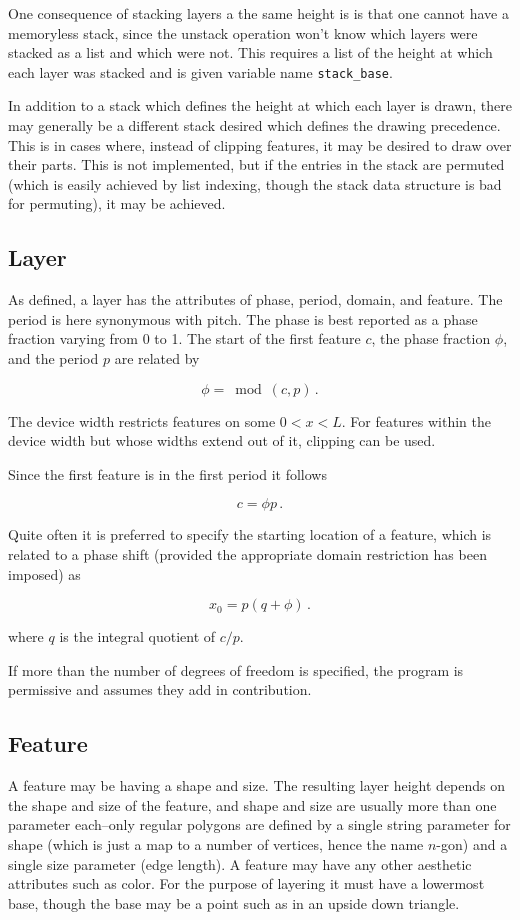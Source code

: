 \documentclass{article}
\begin{document}
One consequence of stacking layers a the same height is is that one cannot have a memoryless stack, since the unstack operation won't know which layers were stacked as a list and which were not. This requires a list of the height at which each layer was stacked and is given variable name \texttt{stack\_base}.

In addition to a stack which defines the height at which each layer is drawn, there may generally be a different stack desired which defines the drawing precedence. This is in cases where, instead of clipping features, it may be desired to draw over their parts. This is not implemented, but if the entries in the stack are permuted (which is easily achieved by list indexing, though the stack data structure is bad for permuting), it may be achieved.

\subsection{Layer}

As defined, a layer has the attributes of phase, period, domain, and feature. The period is here synonymous with pitch. The phase is best reported as a phase fraction varying from 0 to 1. The start of the first feature $c$, the phase fraction $\phi$, and the period $p$ are related by

$$ \phi = \bmod(c, p) \,.$$

The device width restricts features on some $0 < x < L$. For features within the device width but whose widths extend out of it, clipping can be used. 

Since the first feature is in the first period it follows

$$c = \phi p \,. $$

Quite often it is preferred to specify the starting location of a feature, which is related to a phase shift (provided the appropriate domain restriction has been imposed) as

$$ x_0 = p (q + \phi) \,. $$

where $q$ is the integral quotient of $c/p$.

If more than the number of degrees of freedom is specified, the program is permissive and assumes they add in contribution.

\subsection{Feature}

A feature may be having a shape and size. The resulting layer height depends on the shape and size of the feature, and shape and size are usually more than one parameter each--only regular polygons are defined by a single string parameter for shape (which is just a map to a number of vertices, hence the name $n$-gon) and a single size parameter (edge length). A feature may have any other aesthetic attributes such as color. For the purpose of layering it must have a lowermost base, though the base may be a point such as in an upside down triangle.
\end{document}
